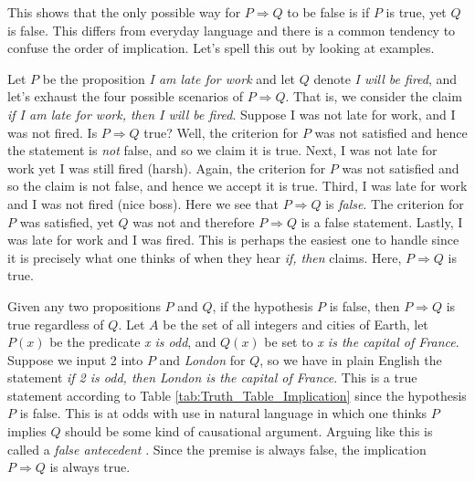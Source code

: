         \par\vspace{2.5ex}
        This shows that the only possible way for $P\Rightarrow{Q}$ to be false
        is if $P$ is true, yet $Q$ is false. This differs from everyday language
        and there is a common tendency to confuse the order of implication.
        Let's spell this out by looking at examples.
        \begin{example}
            \label{ex:Mathematical_Implication}%
            Let $P$ be the proposition \textit{I am late for work} and let $Q$
            denote \textit{I will be fired}, and let's exhaust the four
            possible scenarios of $P\Rightarrow{Q}$. That is, we consider the
            claim \textit{if I am late for work, then I will be fired}. Suppose
            I was not late for work, and I was not fired. Is $P\Rightarrow{Q}$
            true? Well, the criterion for $P$ was not satisfied and hence the
            statement is \textit{not} false, and so we claim it is true. Next, I
            was not late for work yet I was still fired (harsh). Again, the
            criterion for $P$ was not satisfied and so the claim is not false,
            and hence we accept it is true. Third, I was late for work and I was
            not fired (nice boss). Here we see that $P\Rightarrow{Q}$ is
            \textit{false}. The criterion for $P$ was satisfied, yet $Q$ was not
            and therefore $P\Rightarrow{Q}$ is a false statement. Lastly, I was
            late for work and I was fired. This is perhaps the easiest one to
            handle since it is precisely what one thinks of when they hear
            \textit{if, then} claims. Here, $P\Rightarrow{Q}$ is true.
        \end{example}
        \begin{example}
            \label{ex:False_Antecedent}%
            Given any two propositions $P$ and $Q$, if the hypothesis $P$ is
            false, then $P\Rightarrow{Q}$ is true regardless of $Q$. Let $A$ be
            the set of all integers and cities of Earth, let $P(x)$ be the
            predicate \textit{x is odd}, and $Q(x)$ be set to
            \textit{x is the capital of France}. Suppose we input 2 into $P$ and
            \textit{London} for $Q$, so we have in plain English the statement
            \textit{if 2 is odd, then London is the capital of France}. This is
            a true statement according to Table
            \ref{tab:Truth_Table_Implication} since the hypothesis $P$ is false.
            This is at odds with use in natural language in which one thinks
            $P$ implies $Q$ should be some kind of causational argument.
            Arguing like this is called a \textit{false antecedent}%
            . Since the premise is always false, the
            implication $P\Rightarrow{Q}$ is always true.
        \end{example}
